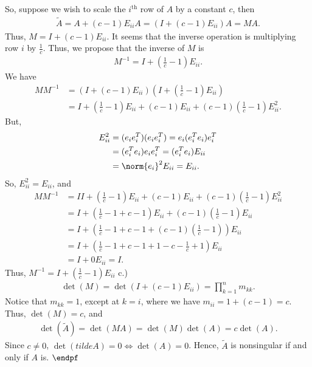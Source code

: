 \documentclass{report}
\begin{document}
    So, suppose we wish to scale the $i^{\text{th}}$ row of $A$ by a constant $c$, then
    \begin{align*}
        \tilde{A}= A + (c-1)E_{ii}A = (I + (c-1)E_{ii})A = MA
    .\end{align*} 
    Thus, $M = I + (c-1)E_{ii}$.
    \bigbreak \noindent 
    It seems that the inverse operation is multiplying row $i$ by $\frac{1}{c}$. Thus, we propose that the inverse of $M$ is
    \begin{align*}
        M^{-1} = I + (\frac{1}{c} - 1)E_{ii}
    .\end{align*}
    We have
    \begin{align*}
        MM^{-1} &= \left(I + (c-1)E_{ii}\right)\left(I + \left(\frac{1}{c}-1\right)E_{ii}\right) \\
                &= I + \left(\frac{1}{c}-1\right)E_{ii} + (c-1)E_{ii} + (c-1)\left(\frac{1}{c}-1\right)E_{ii}^{2}
    .\end{align*}
    But,
    \begin{align*}
        E_{ii}^{2} &= (e_{i}e_{i}^{T})(e_{i}e_{i}^{T}) = e_{i}(e_{i}^{T}e_{i})e_{i}^{T} \\
                   &= (e_{i}^{T}e_{i})e_{i}e_{i}^{T} = (e_{i}^{T}e_{i})E_{ii} \\
                   &= \norm{e_{i}}^{2}E_{ii} = E_{ii}
    .\end{align*}
    So, $E_{ii}^{2} = E_{ii}$, and 
    \begin{align*}
        MM^{-1} &= II + \left(\frac{1}{c}-1\right)E_{ii} + (c-1)E_{ii} + (c-1)\left(\frac{1}{c}-1\right)E_{ii}^{2} \\
        &= I + \left(\frac{1}{c}-1 + c-1\right)E_{ii} + (c-1)\left(\frac{1}{c}-1\right)E_{ii} \\
        &= I + \left(\frac{1}{c}-1 + c-1 + (c-1)\left(\frac{1}{c}-1\right)\right)E_{ii} \\
        &= I + \left(\frac{1}{c}-1+c-1 + 1 -c - \frac{1}{c} + 1\right)E_{ii} \\
        &= I + 0 E_{ii} = I
    .\end{align*}
    Thus, $M^{-1} = I + \left(\frac{1}{c}-1\right) E_{ii}$
    \bigbreak \noindent 
    c.) 
    \begin{align*}
        \det(M) = \det(I + (c-1)E_{ii}) = \prod_{k=1}^{n} m_{kk}
    .\end{align*}
    Notice that $m_{kk} =1$, except at $k=i$, where we have $m_{ii}=  1 + (c-1) = c$. Thus, $\det(M) = c $, and 
    \begin{align*}
        \det(\tilde{A}) = \det(MA) =  \det(M)\det(A) = c\det(A)
    .\end{align*}
    Since $c\ne 0$, $\det(tilde{A}) = 0 \iff \det(A) = 0$. Hence, $\tilde{A}$ is nonsingular if and only if $A$ is. $\endpf$
\end{document}
